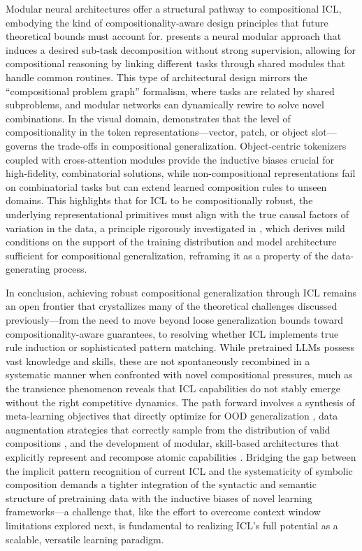 \documentclass[11pt]{article}
\begin{document}
Modular neural architectures offer a structural pathway to compositional ICL, embodying the kind of compositionality-aware design principles that future theoretical bounds must account for. \cite{ref613} presents a neural modular approach that induces a desired sub-task decomposition without strong supervision, allowing for compositional reasoning by linking different tasks through shared modules that handle common routines. This type of architectural design mirrors the ``compositional problem graph'' formalism, where tasks are related by shared subproblems, and modular networks can dynamically rewire to solve novel combinations. In the visual domain, \cite{ref234} demonstrates that the level of compositionality in the token representations---vector, patch, or object slot---governs the trade-offs in compositional generalization. Object-centric tokenizers coupled with cross-attention modules provide the inductive biases crucial for high-fidelity, combinatorial solutions, while non-compositional representations fail on combinatorial tasks but can extend learned composition rules to unseen domains. This highlights that for ICL to be compositionally robust, the underlying representational primitives must align with the true causal factors of variation in the data, a principle rigorously investigated in \cite{ref614}, which derives mild conditions on the support of the training distribution and model architecture sufficient for compositional generalization, reframing it as a property of the data-generating process.

In conclusion, achieving robust compositional generalization through ICL remains an open frontier that crystallizes many of the theoretical challenges discussed previously---from the need to move beyond loose generalization bounds toward compositionality-aware guarantees, to resolving whether ICL implements true rule induction or sophisticated pattern matching. While pretrained LLMs possess vast knowledge and skills, these are not spontaneously recombined in a systematic manner when confronted with novel compositional pressures, much as the transience phenomenon reveals that ICL capabilities do not stably emerge without the right competitive dynamics. The path forward involves a synthesis of meta-learning objectives that directly optimize for OOD generalization \cite{ref615}, data augmentation strategies that correctly sample from the distribution of valid compositions \cite{ref616}, and the development of modular, skill-based architectures that explicitly represent and recompose atomic capabilities \cite{ref610,ref611}. Bridging the gap between the implicit pattern recognition of current ICL and the systematicity of symbolic composition demands a tighter integration of the syntactic and semantic structure of pretraining data with the inductive biases of novel learning frameworks---a challenge that, like the effort to overcome context window limitations explored next, is fundamental to realizing ICL's full potential as a scalable, versatile learning paradigm.
\end{document}

